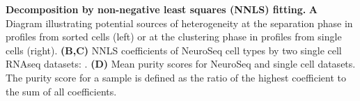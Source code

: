 \textbf{Decomposition by non-negative least squares (NNLS) fitting.}
\textbf{A} Diagram illustrating potential sources of heterogeneity at the separation phase in profiles from sorted cells (left) or at the clustering phase in profiles from single cells (right).
\textbf{(B,C)} NNLS coefficients of NeuroSeq cell types by two single cell RNAseq datasets: \citep{Tasic_2018,Zeisel_2018}.
\textbf{(D)} Mean purity scores for NeuroSeq and single cell datasets. The purity score for a sample is defined as the ratio of the highest coefficient to the sum of all coefficients. 
